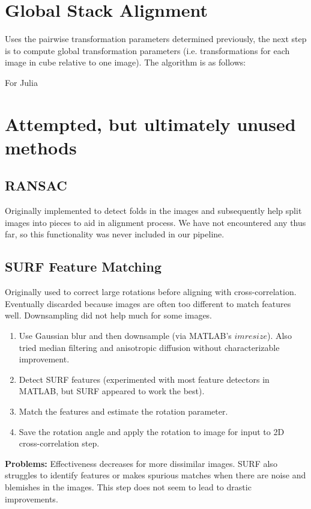 \documentclass{article}
\begin{document}
\section{Global Stack Alignment}
Uses the pairwise transformation parameters determined previously, the next step is to compute global transformation parameters (i.e. transformations for each image in cube relative to one image). The algorithm is as follows:
	\begin{algorithm}
	\DontPrintSemicolon
	For Julia
	\end{algorithm}

\section{Attempted, but ultimately unused methods}
\subsection{RANSAC}
Originally implemented to detect folds in the images and subsequently help split images into pieces to aid in alignment process. We have not encountered any thus far, so this functionality was never included in our pipeline.
\subsection{SURF Feature Matching}
Originally used to correct large rotations before aligning with cross-correlation. Eventually discarded because images are often too different to match features well. Downsampling did not help much for some images.\\
\begin{enumerate}
\item Use Gaussian blur and then downsample (via MATLAB's $imresize$). Also tried median filtering and anisotropic diffusion without characterizable improvement.
\item Detect SURF features (experimented with most feature detectors in MATLAB, but SURF appeared to work the best). 
\item Match the features and estimate the rotation parameter.
\item Save the rotation angle and apply the rotation to image for input to 2D cross-correlation step.
\end{enumerate}
\textbf{Problems:} Effectiveness decreases for more dissimilar images. SURF also struggles to identify features or makes spurious matches when there are noise and blemishes in the images. This step does not seem to lead to drastic improvements. \\
\end{document}
